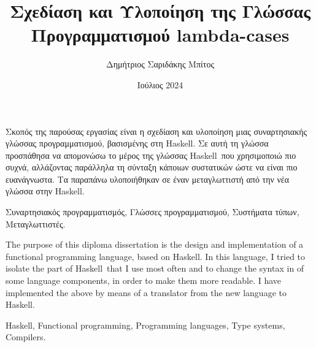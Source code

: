 \documentclass[diploma]{softlab-thesis}
\def\H{Haskell}
\begin{document}

\frontmatter

\title{Σχεδίαση και Υλοποίηση της Γλώσσας Προγραμματισμού lambda-cases}
\author{Δημήτριος Σαριδάκης Μπίτος}
\date{Ιούλιος 2024}




\maketitle



\begin{abstractgr}%
  Σκοπός της παρούσας εργασίας είναι η σχεδίαση και υλοποίηση μιας
  συναρτησιακής γλώσσας προγραμματισμού, βασισμένης στη \H. Σε αυτή
  τη γλώσσα προσπάθησα να απομονώσω το μέρος της γλώσσας \H\ που
  χρησιμοποιώ πιο συχνά, αλλάζοντας παράλληλα τη σύνταξη κάποιων
  συστατικών ώστε να είναι πιο ευανάγνωστα. Τα παραπάνω υλοποιήθηκαν
  σε έναν μεταγλωττιστή από την νέα γλώσσα στην \H.

\begin{keywordsgr}
  Συναρτησιακός προγραμματισμός,
  Γλώσσες προγραμματισμού,
  Συστήματα τύπων,
  Μεταγλωττιστές.
\end{keywordsgr}
\end{abstractgr}


\begin{abstracten}%
  The purpose of this diploma dissertation is the design and implementation
  of a functional programming language, based on \H. In this language, I
  tried to isolate the part of \H\ that I use most often and to change the
  syntax in of some language components, in order to make them more readable.
  I have implemented the above by means of a translator from the new language
  to \H.

\begin{keywordsen}
  Haskell,
  Functional programming,
  Programming languages,
  Type systems,
  Compilers.
\end{keywordsen}
\end{abstracten}
\end{document}
